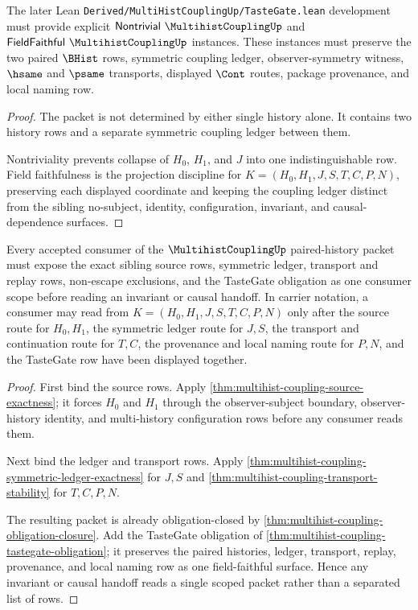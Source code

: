 \begin{theorem}
\label{thm:multihist-coupling-tastegate-obligation}
The later Lean \texttt{Derived/MultiHistCouplingUp/TasteGate.lean} development must provide explicit $\mathsf{Nontrivial}\ \MultihistCouplingUp$ and $\mathsf{FieldFaithful}\ \MultihistCouplingUp$ instances. These instances must preserve the two paired $\BHist$ rows, symmetric coupling ledger, observer-symmetry witness, $\hsame$ and $\psame$ transports, displayed $\Cont$ routes, package provenance, and local naming row.
\end{theorem}
\begin{proof}
The packet is not determined by either single history alone. It contains two history rows and a separate symmetric coupling ledger between them.

Nontriviality prevents collapse of $H_0$, $H_1$, and $J$ into one indistinguishable row. Field faithfulness is the projection discipline for $K=(H_0,H_1,J,S,T,C,P,N)$, preserving each displayed coordinate and keeping the coupling ledger distinct from the sibling no-subject, identity, configuration, invariant, and causal-dependence surfaces.
\end{proof}

\begin{theorem}
\label{thm:multihist-coupling-scoped-route}
Every accepted consumer of the $\MultihistCouplingUp$ paired-history packet must expose the exact sibling source rows, symmetric ledger, transport and replay rows, non-escape exclusions, and the TasteGate obligation as one consumer scope before reading an invariant or causal handoff. In carrier notation, a consumer may read from $K=(H_0,H_1,J,S,T,C,P,N)$ only after the source route for $H_0,H_1$, the symmetric ledger route for $J,S$, the transport and continuation route for $T,C$, the provenance and local naming route for $P,N$, and the TasteGate row have been displayed together.
\end{theorem}
\begin{proof}
First bind the source rows. Apply \autoref{thm:multihist-coupling-source-exactness}; it forces $H_0$ and $H_1$ through the observer-subject boundary, observer-history identity, and multi-history configuration rows before any consumer reads them.

Next bind the ledger and transport rows. Apply \autoref{thm:multihist-coupling-symmetric-ledger-exactness} for $J,S$ and \autoref{thm:multihist-coupling-transport-stability} for $T,C,P,N$.

The resulting packet is already obligation-closed by \autoref{thm:multihist-coupling-obligation-closure}. Add the TasteGate obligation of \autoref{thm:multihist-coupling-tastegate-obligation}; it preserves the paired histories, ledger, transport, replay, provenance, and local naming row as one field-faithful surface. Hence any invariant or causal handoff reads a single scoped packet rather than a separated list of rows.
\end{proof}

